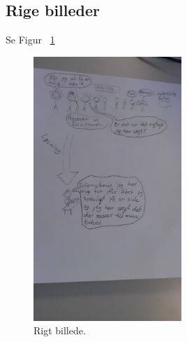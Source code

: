 \documentclass[12pt, a4paper]{report}
\begin{document}
\subsection{Rige billeder}
Se Figur ~\ref{r_billede}
\begin{figure}
\includegraphics[width=0.5\textwidth]{rigtbillede}
\caption{Rigt billede.}
\label{r_billede}
\end{figure}
\end{document}
